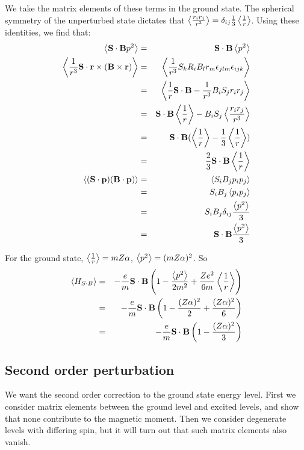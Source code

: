 We take the matrix elements of these terms in the ground state.  The spherical symmetry of the unperturbed state dictates that $\left< \frac{r_i r_j}{r^3} \right>=\delta_{ij}\frac{1}{3}\left< \frac{1}{r} \right>$.
Using these identities, we find that:
\begin{eqnarray*}
\left< \mathbf{S} \cdot \mathbf{B} p^2 \right> 
	&=& \mathbf{S} \cdot \mathbf{B} \left< p^2 \right>	\\
 \left< \frac{1}{r^3} \mathbf{S} \cdot \mathbf{r} \times (\mathbf{B} \times \mathbf{r}) \right>
	&=&	\left< \frac{1}{r^3} S_k R_i B_l r_m \epsilon_{jlm} \epsilon_{ijk} \right>	\\
	&=&	\left<  \frac{1}{r} \mathbf{S} \cdot \mathbf{B}  - \frac{1}{r^3} B_i S_j r_i r_j  \right>	\\
	&=&	\mathbf{S} \cdot \mathbf{B} \left< \frac{1}{r} \right> - B_i S_j \left< \frac{r_i r_j}{r^3} \right>	\\
	&=&	\mathbf{S} \cdot \mathbf{B}(\left< \frac{1}{r} \right> - \frac{1}{3}\left< \frac{1}{r} \right>)	\\
	&=&	\frac{2}{3} \mathbf{S} \cdot \mathbf{B}\left< \frac{1}{r} \right>\\
\left<  (\mathbf{S} \cdot \mathbf{p}) (\mathbf{B} \cdot \mathbf{p})  \right>
	&=&	\left<  S_i B_j p_i p_j  \right>	\\
	&=&	S_i B_j \left< p_i p_j \right>	\\
	&=&	S_i B_j \delta_{ij} \frac{\left< p^2 \right>}{3}  \\
	&=&	 \mathbf{S} \cdot \mathbf{B} \frac{\left< p^2 \right>}{3}
\end{eqnarray*}

For the ground state, $\left< \frac{1}{r}  \right>= mZ\alpha$, $\left< p^2 \right> = (mZ\alpha)^2$.  So 
\begin{eqnarray*}  
\left< H_{S \cdot B}  \right>
	&=& - \frac{e}{m} \mathbf{S} \cdot \mathbf{B} 
		\left ( 1 - \frac{\left< p^2 \right>}{2m^2}  + \frac{Ze^2}{6m}\left< \frac{1}{r} \right>\right )	\\
	&=&  - \frac{e}{m} \mathbf{S} \cdot \mathbf{B} \left (1 - \frac{ (Z \alpha)^2}{2} +\frac{(Z\alpha)^2}{6} \right )	\\
	&=&  - \frac{e}{m} \mathbf{S} \cdot \mathbf{B} \left (1 - \frac{(Z\alpha)^2}{3} \right )	\\
\end{eqnarray*}


\subsection*{Second order perturbation}
We want the second order correction to the ground state energy level.  First we consider matrix elements between the ground level and excited levels, and show that none contribute to the magnetic moment.  Then we consider degenerate levels with differing spin, but it will turn out that such matrix elements also vanish.

